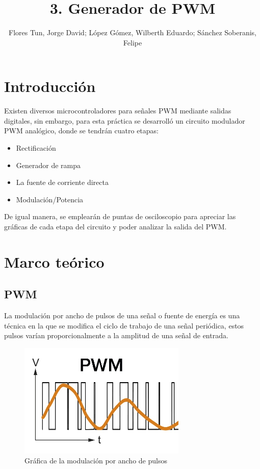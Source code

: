 \documentclass[]{article}
\title{3. Generador de PWM}
\author{Flores Tun, Jorge David; López Gómez, Wilberth Eduardo; Sánchez Soberanis, Felipe}
\begin{document}
\maketitle

\section{Introducción}

Existen diversos microcontroladores para señales PWM mediante salidas digitales, sin embargo, para esta práctica se desarrolló un circuito modulador PWM analógico, donde se tendrán
cuatro etapas: 

\begin{itemize}
    \item Rectificación
    \item Generador de rampa
    \item La fuente de corriente directa
    \item Modulación/Potencia
\end{itemize}

De igual manera, se emplearán de puntas de osciloscopio para apreciar las gráficas de cada etapa del circuito y poder analizar la salida del PWM.

\section{Marco teórico}

\subsection{PWM}

La modulación por ancho de pulsos de una señal o fuente de energía es una técnica en la que se modifica el ciclo de trabajo de una señal periódica, estos pulsos varían proporcionalmente
a la amplitud de una señal de entrada.

\begin{figure}[htb]
    \centering
    \includegraphics[width=8cm]{build/Imagenes/PWM.jpg}
    \caption{ Gráfica de la modulación por ancho de pulsos}
\end{figure}
\end{document}
